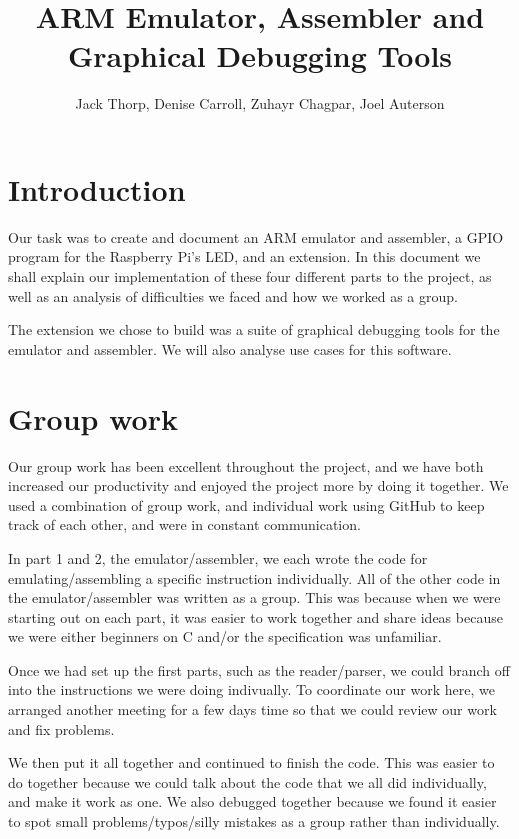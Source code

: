 \documentclass[11pt]{article}
\begin{document}
\title{ARM Emulator, Assembler and Graphical Debugging Tools}
\author{Jack Thorp, Denise Carroll, Zuhayr Chagpar, Joel Auterson}

\maketitle

\section{Introduction}
Our task was to create and document an ARM emulator and assembler, a GPIO program for the Raspberry Pi's LED, and an extension. In this document we shall explain our implementation of these four different parts to the project, as well as an analysis of difficulties we faced and how we worked as a group.

The extension we chose to build was a suite of graphical debugging tools for the emulator and assembler. We will also analyse use cases for this software.

\section{Group work}
Our group work has been excellent throughout the project, and we have both increased our productivity and enjoyed the project more by doing it together.  We used a combination of group work, and individual work using GitHub to keep track of each other, and were in constant communication.

In part 1 and 2, the emulator/assembler, we each wrote the code for emulating/assembling a specific instruction individually. All of the other code in the emulator/assembler was written as a group. This was because when we were starting out on each part, it was easier to work together and share ideas because we were either beginners on C and/or the specification was unfamiliar.

Once we had set up the first parts, such as the reader/parser, we could branch off into the instructions we were doing indivually. To coordinate our work here, we arranged another meeting for a few days time so that we could review our work and fix problems.

We then put it all together and continued to finish the code. This was easier to do together because we could talk about the code that we all did individually, and make it work as one. We also debugged together because we found it easier to spot small problems/typos/silly mistakes as a group rather than individually.
\end{document}
